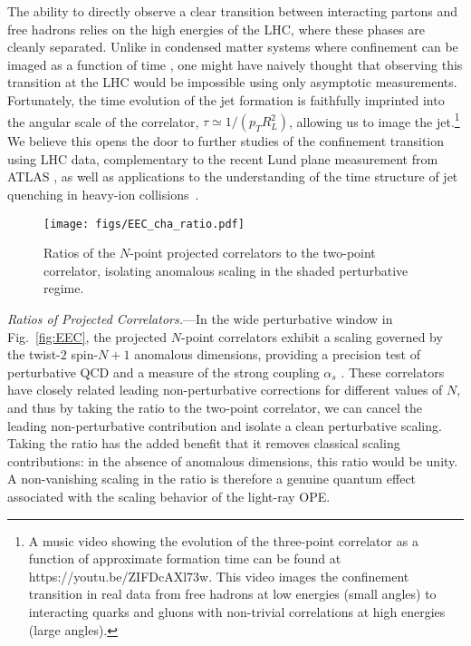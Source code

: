 \documentclass[aps,prl,twocolumn,showpacs,10pt,superscriptaddress,preprintnumbers,nofootinbib,longbibliography]{revtex4-1}
\DeclareRobustCommand{\Fig}[1]{Fig.~\ref{#1}}
\begin{document}
The ability to directly observe a clear transition between interacting partons and free hadrons relies on the high energies of the LHC, where these phases are cleanly separated.
%
Unlike in condensed matter systems where confinement can be imaged as a function of time \cite{Kormos:2017aa}, one might have naively thought that observing this transition at the LHC would be impossible using only asymptotic measurements.
%
Fortunately, the time evolution of the jet formation is faithfully imprinted into the angular scale of the correlator, $\tau\simeq1/(p_T R_L^2)$, allowing us to image the jet.\footnote{A music video showing the evolution of the three-point correlator as a function of approximate formation  time can be found at https://youtu.be/ZIFDcAXl73w. This video images the confinement transition in real data from free hadrons at low energies (small angles) to interacting quarks and gluons with non-trivial correlations at high energies (large angles).}
%
We believe this opens the door to further studies of the confinement transition using LHC data, complementary to the recent Lund plane measurement from ATLAS \cite{ATLAS:2020bbn}, as well as applications to the understanding of the time structure of jet quenching in heavy-ion collisions~\cite{Apolinario:2017sob,Andrews:2018jcm,Mehtar-Tani:2019rrk,Apolinario:2020uvt}.


\begin{figure}[t]
\texttt{[image: figs/EEC\_cha\_ratio.pdf]}
\caption{
%
Ratios of the $N$-point projected correlators to the two-point correlator, isolating anomalous scaling in the shaded perturbative regime.}
%
\label{fig:EEC_ratio}
\end{figure}


\emph{Ratios of Projected Correlators.}---In the wide perturbative window in \Fig{fig:EEC}, the projected $N$-point correlators exhibit a scaling governed by the twist-$2$ spin-$N+1$ anomalous dimensions, providing a precision test of perturbative QCD and a measure of the strong coupling $\alpha_s$ \cite{Chen:2020vvp}.
%
These correlators have closely related leading non-perturbative corrections for different values of $N$, and thus by taking the ratio to the two-point correlator, we can cancel the leading non-perturbative contribution and isolate a clean perturbative scaling.
%
Taking the ratio has the added benefit that it removes classical scaling contributions: in the absence of anomalous dimensions, this ratio would be unity.
%
A non-vanishing scaling in the ratio is therefore a genuine quantum effect associated with the scaling behavior of the light-ray OPE.
\end{document}
